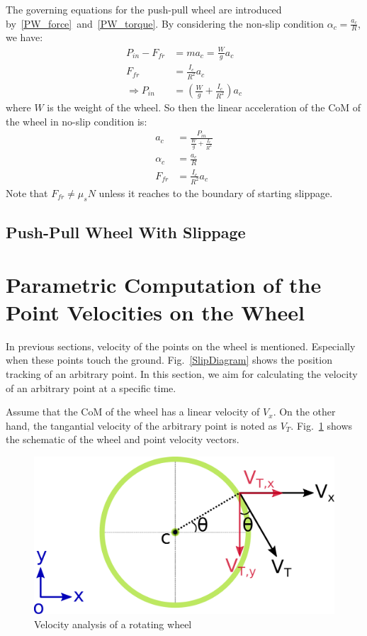 \documentclass[letterpaper, 10pt, conference]{ieeeconf}
\begin{document}
The governing equations for the push-pull wheel are introduced by~\eqref{PW_force}~and~\eqref{PW_torque}. By considering the non-slip condition $\alpha_c = \frac{a_c}{R}$, we have:
\begin{align}
P_{in} - F_{fr} &= ma_c = \frac{W}{g} a_c \\
F_{fr} &= \frac{I_c}{R^2} a_c \\
\Rightarrow P_{in} &= (\frac{W}{g} + \frac{I_c}{R^2})a_c
\end{align}
where $W$ is the weight of the wheel. So then the linear acceleration of the CoM of the wheel in no-slip condition is:
\begin{align}
a_c &= \frac{P_{in}}{\frac{W}{g} + \frac{I_c}{R^2}} \\
\alpha_c &= \frac{a_c}{R} \\
F_{fr} &= \frac{I_c}{R^2} a_c
\end{align}
Note that $F_{fr} \neq \mu_{s}N$ unless it reaches to the boundary of starting slippage.
\subsection{Push-Pull Wheel With Slippage}


\section{Parametric Computation of the Point Velocities on the Wheel}
In previous sections, velocity of the points on the wheel is mentioned. Especially when these points touch the ground. Fig.~\ref{SlipDiagram} shows the position tracking of an arbitrary point. In this section, we aim for calculating the velocity of an arbitrary point at a specific time.

Assume that the CoM of the wheel has a linear velocity of $V_x$. On the other hand, the tangantial velocity of the arbitrary point is noted as $V_T$. Fig.~\ref{velocityCalc} shows the schematic of the wheel and point velocity vectors.
\begin{figure}[!h] 
	\centering
	\includegraphics[width=0.85\columnwidth]{figs/velocityCalc.pdf}
	\caption{Velocity analysis of a rotating wheel}
	\label{velocityCalc}
\end{figure}
\end{document}
